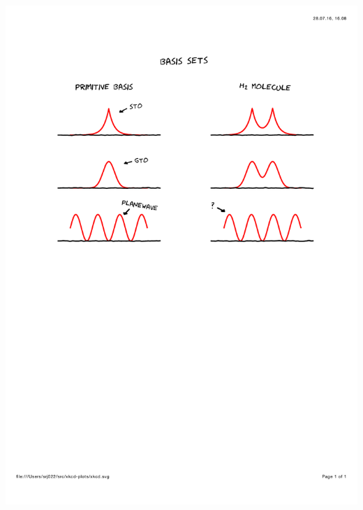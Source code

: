 \begin{frame}
\begin{center}
    \includegraphics[scale=0.6, clip, viewport = 50 435 550 515]{figures/basis_set_3.pdf}
    \end{center}
\end{frame}


